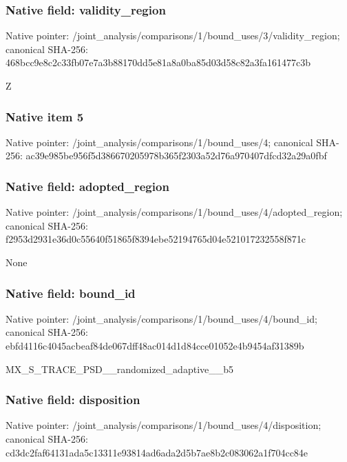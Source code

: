 \documentclass[10pt,a4paper]{article}
\begin{document}
\subsubsection{Native field: validity\_\allowbreak{}region}
Native pointer: /joint\_\allowbreak{}analysis/comparisons/1/bound\_\allowbreak{}uses/3/validity\_\allowbreak{}region; canonical SHA-256: 468bcc9e8c2c33fb07e7a3b88170dd5e81a8a0ba85d03d58c82a3fa161477c3b

\begingroup\raggedright\sloppy Z\par\endgroup

\subsubsection{Native item 5}
Native pointer: /joint\_\allowbreak{}analysis/comparisons/1/bound\_\allowbreak{}uses/4; canonical SHA-256: ac39e985be956f5d386670205978b365f2303a52d76a970407dfcd32a29a0fbf

\subsubsection{Native field: adopted\_\allowbreak{}region}
Native pointer: /joint\_\allowbreak{}analysis/comparisons/1/bound\_\allowbreak{}uses/4/adopted\_\allowbreak{}region; canonical SHA-256: f2953d2931e36d0c55640f51865f8394ebe52194765d04e521017232558f871c

\begingroup\raggedright\sloppy None\par\endgroup

\subsubsection{Native field: bound\_\allowbreak{}id}
Native pointer: /joint\_\allowbreak{}analysis/comparisons/1/bound\_\allowbreak{}uses/4/bound\_\allowbreak{}id; canonical SHA-256: ebfd4116c4045acbeaf84de067dff48ac014d1d84cce01052e4b9454af31389b

\begingroup\raggedright\sloppy MX\_\allowbreak{}S\_\allowbreak{}TRACE\_\allowbreak{}PSD\_\allowbreak{}\_\allowbreak{}randomized\_\allowbreak{}adaptive\_\allowbreak{}\_\allowbreak{}b5\par\endgroup

\subsubsection{Native field: disposition}
Native pointer: /joint\_\allowbreak{}analysis/comparisons/1/bound\_\allowbreak{}uses/4/disposition; canonical SHA-256: cd3dc2faf64131ada5c13311e93814ad6ada2d5b7ae8b2c083062a1f704cc84e
\end{document}
